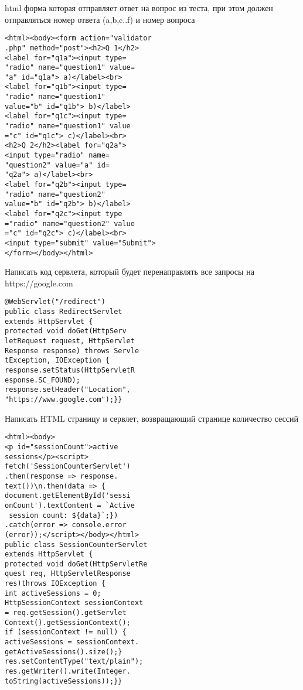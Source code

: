 \documentclass{article}
\begin{document}
\hfill
\begin{minipage}{.2\textwidth}
html форма которая отправляет ответ на вопрос из теста, при этом должен отправляться номер ответа (a,b,c..f) и номер вопроса
\begin{lstlisting}
<html><body><form action="validator
.php" method="post"><h2>Q 1</h2>
<label for="q1a"><input type=
"radio" name="question1" value=
"a" id="q1a"> a)</label><br>
<label for="q1b"><input type=
"radio" name="question1" 
value="b" id="q1b"> b)</label>
<label for="q1c"><input type=
"radio" name="question1" value
="c" id="q1c"> c)</label><br>
<h2>Q 2</h2><label for="q2a">
<input type="radio" name=
"question2" value="a" id=
"q2a"> a)</label><br>
<label for="q2b"><input type=
"radio" name="question2" 
value="b" id="q2b"> b)</label>
<label for="q2c"><input type
="radio" name="question2" value
="c" id="q2c"> c)</label><br>
<input type="submit" value="Submit">
</form></body></html>    
\end{lstlisting}
\end{minipage}
\hfill
\begin{minipage}{.2\textwidth}
Написать код сервлета, который будет перенаправлять все запросы на https://google.com
\begin{lstlisting}
@WebServlet("/redirect")
public class RedirectServlet 
extends HttpServlet {
protected void doGet(HttpServ
letRequest request, HttpServlet
Response response) throws Servle
tException, IOException {
response.setStatus(HttpServletR
esponse.SC_FOUND);
response.setHeader("Location", 
"https://www.google.com");}}
\end{lstlisting}
\end{minipage}
\hfill
\begin{minipage}{.2\textwidth}
Написать HTML страницу и сервлет, возвращающий странице количество сессий
\begin{lstlisting}
<html><body>
<p id="sessionCount">active 
sessions</p><script>
fetch('SessionCounterServlet')
.then(response => response.
text())\n.then(data => {
document.getElementById('sessi
onCount').textContent = `Active
 session count: ${data}`;})
.catch(error => console.error
(error));</script></body></html>
public class SessionCounterServlet
extends HttpServlet {
protected void doGet(HttpServletRe
quest req, HttpServletResponse 
res)throws IOException {
int activeSessions = 0;
HttpSessionContext sessionContext 
= req.getSession().getServlet
Context().getSessionContext();
if (sessionContext != null) {
activeSessions = sessionContext.
getActiveSessions().size();}
res.setContentType("text/plain");
res.getWriter().write(Integer.
toString(activeSessions));}}
\end{lstlisting}
\end{minipage}
\end{document}
